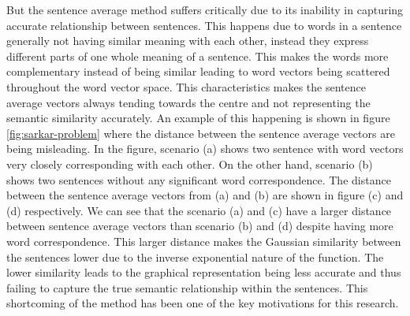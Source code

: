 But the sentence average method suffers critically due to its inability in capturing accurate relationship between sentences. This happens due to words in a sentence generally not having similar meaning with each other, instead they express different parts of one whole meaning of a sentence. This makes the words more complementary instead of being similar leading to word vectors being scattered throughout the word vector space. This characteristics makes the sentence average vectors always tending towards the centre and not representing the semantic similarity accurately. An example of this happening is shown in figure \ref{fig:sarkar-problem} where the distance between the sentence average vectors are being misleading. In the figure, scenario (a) shows two sentence with word vectors very closely corresponding with each other. On the other hand, scenario (b) shows two sentences without any significant word correspondence. The distance between the sentence average vectors  from (a) and (b) are shown in figure (c) and (d) respectively. We can see that the scenario (a) and (c) have a larger distance between sentence average vectors than scenario (b) and (d) despite having more word correspondence. This larger distance makes the Gaussian similarity between the sentences lower due to the inverse exponential nature of the function. The lower similarity leads to the graphical representation being less accurate and thus failing to capture the true semantic relationship within the sentences. This shortcoming of the method has been one of the key motivations for this research.